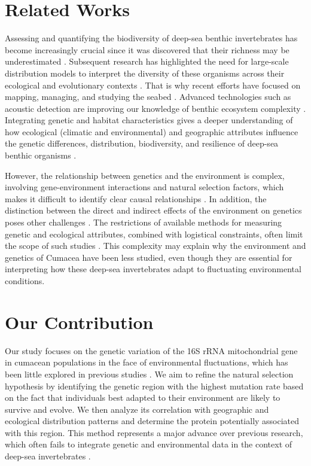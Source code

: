 \section{Related Works}\label{related-works}
Assessing and quantifying the biodiversity of deep-sea benthic invertebrates has become increasingly crucial since it was discovered that their richness may be underestimated \citep{grassle1992deep}. Subsequent research has highlighted the need for large-scale distribution models to interpret the diversity of these organisms across their ecological and evolutionary contexts \citep{rex1997large}. That is why recent efforts have focused on mapping, managing, and studying the seabed \citep{brown2011benthic}. Advanced technologies such as acoustic detection are improving our knowledge of benthic ecosystem complexity \citep{brown2011benthic}. Integrating genetic and habitat characteristics gives a deeper understanding of how ecological (climatic and environmental) and geographic attributes influence the genetic differences, distribution, biodiversity, and resilience of deep-sea benthic organisms \citep{vrijenhoek2009cryptic}.

However, the relationship between genetics and the environment is complex, involving gene-environment interactions and natural selection factors, which makes it difficult to identify clear causal relationships \citep{balkenhol_identifying_2009}. In addition, the distinction between the direct and indirect effects of the environment on genetics poses other challenges \citep{manel_perspectives_2010, balkenhol_landscape_2019}. The restrictions of available methods for measuring genetic and ecological attributes, combined with logistical constraints, often limit the scope of such studies \citep{manel_perspectives_2010, shafer_widespread_2013}. This complexity may explain why the environment and genetics of Cumacea have been less studied, even though they are essential for interpreting how these deep-sea invertebrates adapt to fluctuating environmental conditions.

\section{Our Contribution}\label{contribution}
Our study focuses on the genetic variation of the 16S rRNA mitochondrial gene in cumacean populations in the face of environmental fluctuations, which has been little explored in previous studies \citep{grassle1992deep, rex2000latitudinal}. We aim to refine the natural selection hypothesis by identifying the genetic region with the highest mutation rate based on the fact that individuals best adapted to their environment are likely to survive and evolve. We then analyze its correlation with geographic and ecological distribution patterns and determine the protein potentially associated with this region. This method represents a major advance over previous research, which often fails to integrate genetic and environmental data in the context of deep-sea invertebrates \citep{etter1990population, vrijenhoek2009cryptic}.

